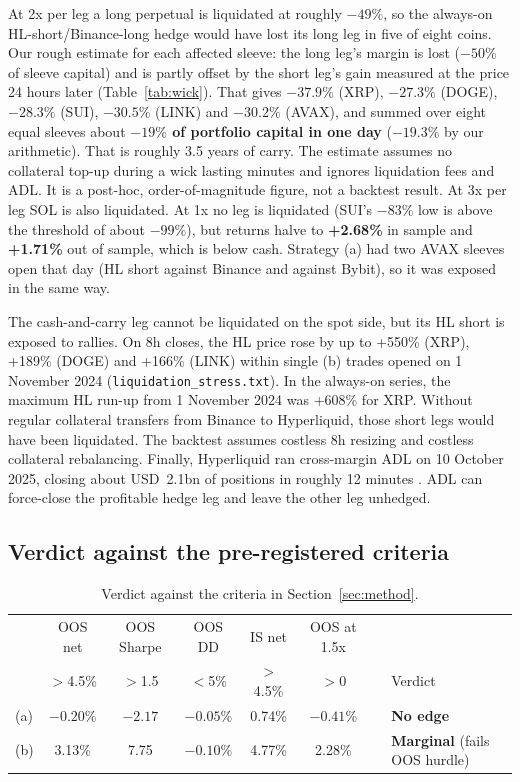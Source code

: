 \documentclass[11pt,a4paper]{article}
\begin{document}
\noindent At 2x per leg a long perpetual is liquidated at roughly $-49\%$, so the always-on HL-short/Binance-long hedge would have lost its long leg in five of eight coins.
Our rough estimate for each affected sleeve: the long leg's margin is lost ($-50\%$ of sleeve capital) and is partly offset by the short leg's gain measured at the price 24 hours later (Table~\ref{tab:wick}). That gives $-37.9\%$ (XRP), $-27.3\%$ (DOGE), $-28.3\%$ (SUI), $-30.5\%$ (LINK) and $-30.2\%$ (AVAX), and summed over eight equal sleeves about \textbf{$-19\%$ of portfolio capital in one day} ($-19.3\%$ by our arithmetic). That is roughly 3.5 years of carry.
The estimate assumes no collateral top-up during a wick lasting minutes and ignores liquidation fees and ADL. It is a post-hoc, order-of-magnitude figure, not a backtest result.
At 3x per leg SOL is also liquidated. At 1x no leg is liquidated (SUI's $-83\%$ low is above the threshold of about $-99\%$), but returns halve to \textbf{+2.68\%} in sample and \textbf{+1.71\%} out of sample, which is below cash.
Strategy (a) had two AVAX sleeves open that day (HL short against Binance and against Bybit), so it was exposed in the same way.

The cash-and-carry leg cannot be liquidated on the spot side, but its HL short is exposed to rallies. On 8h closes, the HL price rose by up to +550\% (XRP), +189\% (DOGE) and +166\% (LINK) within single (b) trades opened on 1 November 2024 (\texttt{liquidation\_stress.txt}). In the always-on series, the maximum HL run-up from 1 November 2024 was +608\% for XRP.
Without regular collateral transfers from Binance to Hyperliquid, those short legs would have been liquidated. The backtest assumes costless 8h resizing and costless collateral rebalancing.
Finally, Hyperliquid ran cross-margin ADL on 10 October 2025, closing about USD~2.1bn of positions in roughly 12 minutes \citep{chitra2025adl}. ADL can force-close the profitable hedge leg and leave the other leg unhedged.

\subsection{Verdict against the pre-registered criteria}
\begin{table}[H]
\centering\small
\caption{Verdict against the criteria in Section~\ref{sec:method}.}
\label{tab:verdict}
\begin{tabular}{lccccccl}
\toprule
 & OOS net & OOS Sharpe & OOS DD & IS net & OOS at 1.5x & & \\
 & $>$4.5\% & $>$1.5 & $<$5\% & $>$4.5\% & $>$0 & & Verdict\\
\midrule
(a) & $-0.20\%$ & $-2.17$ & $-0.05\%$ & 0.74\% & $-0.41\%$ & & \textbf{No edge}\\
(b) & 3.13\% & 7.75 & $-0.10\%$ & 4.77\% & 2.28\% & & \textbf{Marginal} (fails OOS hurdle)\\
\bottomrule
\end{tabular}
\end{table}
\end{document}
